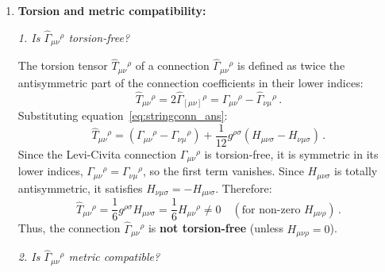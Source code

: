 \documentclass[12pt]{article}
\newcommand{\be}{\begin{equation}}
\newcommand{\ee}{\end{equation}}
\begin{document}
\begin{enumerate}[label=\alph*)]
\item \textbf{Torsion and metric compatibility:}

\emph{1. Is $\hat\Gamma_{\mu\nu}{}^\rho$ torsion-free?}

The torsion tensor $\hat{T}_{\mu\nu}{}^\rho$ of a connection $\hat\Gamma_{\mu\nu}{}^\rho$ is defined as twice the antisymmetric part of the connection coefficients in their lower indices:
\be
\hat{T}_{\mu\nu}{}^\rho = 2 \hat\Gamma_{[\mu\nu]}{}^\rho = \hat\Gamma_{\mu\nu}{}^\rho - \hat\Gamma_{\nu\mu}{}^\rho \,.
\ee
Substituting equation~\eqref{eq:stringconn_ans}:
\be
\hat{T}_{\mu\nu}{}^\rho = \left( \Gamma_{\mu\nu}{}^\rho - \Gamma_{\nu\mu}{}^\rho \right) + \frac{1}{12} g^{\rho\sigma} \left( H_{\mu\nu\sigma} - H_{\nu\mu\sigma} \right) \,.
\ee
Since the Levi-Civita connection $\Gamma_{\mu\nu}{}^\rho$ is torsion-free, it is symmetric in its lower indices, $\Gamma_{\mu\nu}{}^\rho = \Gamma_{\nu\mu}{}^\rho$, so the first term vanishes. Since $H_{\mu\nu\sigma}$ is totally antisymmetric, it satisfies $H_{\nu\mu\sigma} = -H_{\mu\nu\sigma}$. Therefore:
\be
\hat{T}_{\mu\nu}{}^\rho = \frac{1}{6} g^{\rho\sigma} H_{\mu\nu\sigma} = \frac{1}{6} H_{\mu\nu}{}^\rho \neq 0 \quad (\text{for non-zero } H_{\mu\nu\rho}) \,.
\ee
Thus, the connection $\hat\Gamma_{\mu\nu}{}^\rho$ is \textbf{not torsion-free} (unless $H_{\mu\nu\rho} = 0$).

\medskip
\emph{2. Is $\hat\Gamma_{\mu\nu}{}^\rho$ metric compatible?}


\end{enumerate}
\end{document}
